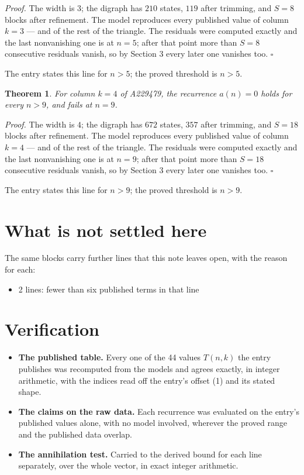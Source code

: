 \documentclass[11pt]{article}
\newtheorem{theorem}{Theorem}
\theoremstyle{definition}
\begin{document}
{\itshape Proof.} The width is $3$; the digraph has $210$ states, $119$ after trimming, and $S = 8$ blocks after refinement. The model reproduces every published value of column $k = 3$ --- and of the rest of the triangle. The residuals were computed exactly and the last nonvanishing one is at $n = 5$; after that point more than $S = 8$ consecutive residuals vanish, so by Section 3 every later one vanishes too. $\square$

The entry states this line for $n > 5$; the proved threshold is $n > 5$.

\begin{theorem} For column $k = 4$ of A229479, the recurrence $a(n) = 0$ holds for every $n > 9$, and fails at $n = 9$.\end{theorem}

{\itshape Proof.} The width is $4$; the digraph has $672$ states, $357$ after trimming, and $S = 18$ blocks after refinement. The model reproduces every published value of column $k = 4$ --- and of the rest of the triangle. The residuals were computed exactly and the last nonvanishing one is at $n = 9$; after that point more than $S = 18$ consecutive residuals vanish, so by Section 3 every later one vanishes too. $\square$

The entry states this line for $n > 9$; the proved threshold is $n > 9$.

\section{What is not settled here}

The same blocks carry further lines that this note leaves open, with the reason for each:

\begin{itemize}

\item 2 lines: fewer than six published terms in that line

\end{itemize}

\section{Verification}

\begin{itemize}

\item {\bfseries The published table.} Every one of the 44 values $T(n,k)$ the entry publishes was recomputed from the models and agrees exactly, in integer arithmetic, with the indices read off the entry's offset (1) and its stated shape.

\item {\bfseries The claims on the raw data.} Each recurrence was evaluated on the entry's published values alone, with no model involved, wherever the proved range and the published data overlap.

\item {\bfseries The annihilation test.} Carried to the derived bound for each line separately, over the whole vector, in exact integer arithmetic.

\end{itemize}
\end{document}
